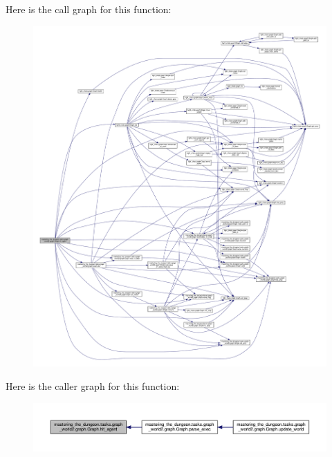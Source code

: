 Here is the call graph for this function\+:
\nopagebreak
\begin{figure}[H]
\begin{center}
\leavevmode
\includegraphics[width=350pt]{classmastering__the__dungeon_1_1tasks_1_1graph__world2_1_1graph_1_1Graph_a044b163ff53309b39883977585ae7434_cgraph}
\end{center}
\end{figure}
Here is the caller graph for this function\+:
\nopagebreak
\begin{figure}[H]
\begin{center}
\leavevmode
\includegraphics[width=350pt]{classmastering__the__dungeon_1_1tasks_1_1graph__world2_1_1graph_1_1Graph_a044b163ff53309b39883977585ae7434_icgraph}
\end{center}
\end{figure}
\mbox{\label{classmastering__the__dungeon_1_1tasks_1_1graph__world2_1_1graph_1_1Graph_aafec1a36e3d07f03b20cca875acde01f}} 
